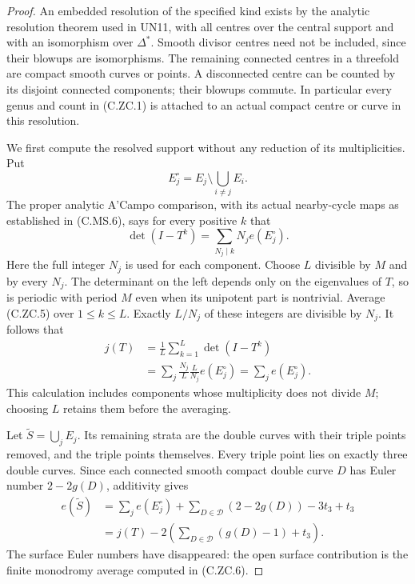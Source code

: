 \begin{proof}
An embedded resolution of the specified kind
exists by the analytic resolution theorem used
in UN11, with all centres over the central
support and with an isomorphism over
$\Delta^*$. Smooth divisor centres need
not be included, since their blowups are
isomorphisms. The remaining connected centres
in a threefold are compact smooth curves or
points. A disconnected centre can be counted
by its disjoint connected components; their
blowups commute. In particular every genus
and count in (C.ZC.1) is attached to an actual
compact centre or curve in this resolution.

We first compute the resolved support without
any reduction of its multiplicities. Put
\[
             E_j^\circ=E_j\setminus\bigcup_{i\ne j}E_i.
\]
The proper analytic A'Campo comparison, with
its actual nearby-cycle maps as established
in (C.MS.6), says for every positive $k$ that
\[
         \det(I-T^k)=\sum_{N_j\mid k}N_j e(E_j^\circ).
                                                               \tag{C.ZC.5}
\]
Here the full integer $N_j$ is used for each
component. Choose $L$ divisible by $M$ and
by every $N_j$. The determinant on the left
depends only on the eigenvalues of $T$,
so is periodic with period $M$ even when
its unipotent part is nontrivial. Average
(C.ZC.5) over $1\le k\le L$. Exactly $L/N_j$
of these integers are divisible by $N_j$.
It follows that
\[
 \begin{split}
 j(T)
 &=\frac1L\sum_{k=1}^{L}\det(I-T^k)\\
 &=\sum_j\frac{N_j}{L}\frac{L}{N_j}e(E_j^\circ)
   =\sum_j e(E_j^\circ).
 \end{split}                                                   \tag{C.ZC.6}
\]
This calculation includes components whose
multiplicity does not divide $M$; choosing
$L$ retains them before the averaging.

Let $\widetilde S=\bigcup_jE_j$. Its
remaining strata are the double curves
with their triple points removed, and
the triple points themselves. Every
triple point lies on exactly three
double curves. Since each connected
smooth compact double curve $D$ has
Euler number $2-2g(D)$, additivity gives
\[
 \begin{split}
 e(\widetilde S)
 &=\sum_j e(E_j^\circ)
       +\sum_{D\in\mathcal D}(2-2g(D))-3t_3+t_3\\
 &=j(T)-2\left(
           \sum_{D\in\mathcal D}(g(D)-1)+t_3\right).
 \end{split}                                                   \tag{C.ZC.7}
\]
The surface Euler numbers have disappeared:
the open surface contribution is the finite
monodromy average computed in (C.ZC.6).


\end{proof}
